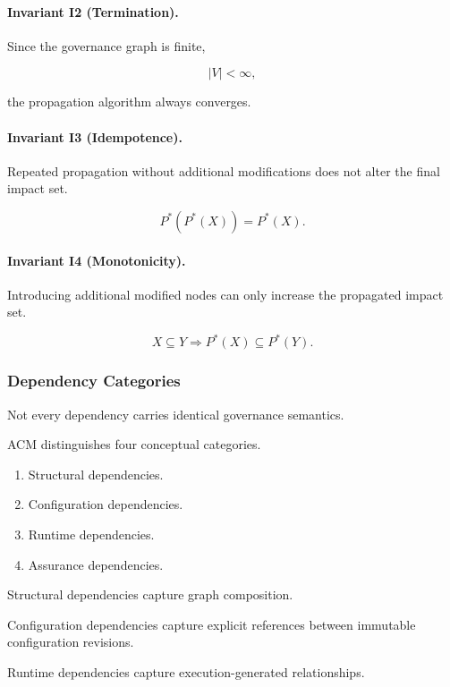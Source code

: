 \documentclass[10pt]{article}
\begin{document}
\paragraph{Invariant I2 (Termination).}

Since the governance graph is finite,

\[
|V|<\infty,
\]

the propagation algorithm always converges.

\paragraph{Invariant I3 (Idempotence).}

Repeated propagation without additional modifications does not alter the final
impact set.

\[
P^\ast(P^\ast(X))
=
P^\ast(X).
\]

\paragraph{Invariant I4 (Monotonicity).}

Introducing additional modified nodes can only increase the propagated impact
set.

\[
X
\subseteq
Y
\Longrightarrow
P^\ast(X)
\subseteq
P^\ast(Y).
\]

\subsubsection{Dependency Categories}

Not every dependency carries identical governance semantics.

ACM distinguishes four conceptual categories.

\begin{enumerate}
    \item Structural dependencies.
    \item Configuration dependencies.
    \item Runtime dependencies.
    \item Assurance dependencies.
\end{enumerate}

Structural dependencies capture graph composition.

Configuration dependencies capture explicit references between immutable
configuration revisions.

Runtime dependencies capture execution-generated relationships.
\end{document}
